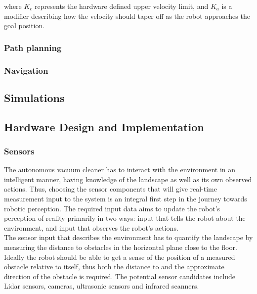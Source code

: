 where $K_c$ represents the hardware defined upper velocity limit, and $K_a$ is a modifier describing how the velocity should taper off as the robot approaches the goal position.

\subsubsection{Path planning}
\label{sec:path-plan}

\subsubsection{Navigation}
\label{sec:navigation}

\subsection{Simulations}
\label{sec:sim}

\subsection{Hardware Design and Implementation}

\subsubsection{Sensors}
\label{sec:sensors}

The autonomous vacuum cleaner has to interact with the environment in an intelligent manner, having knowledge of the landscape as well as its own observed actions. Thus, choosing the sensor components that will give real-time measurement input to the system is an integral first step in the journey towards robotic perception. The required input data aims to update the robot's perception of reality primarily in two ways: input that tells the robot about the environment, and input that observes the robot's actions. \\

The sensor input that describes the environment has to quantify the landscape by measuring the distance to obstacles in the horizontal plane close to the floor. Ideally the robot should be able to get a sense of the position of a measured obstacle relative to itself, thus both the distance to and the approximate direction of the obstacle is required. The potential sensor candidates include Lidar sensors, cameras, ultrasonic sensors and infrared scanners. \\

